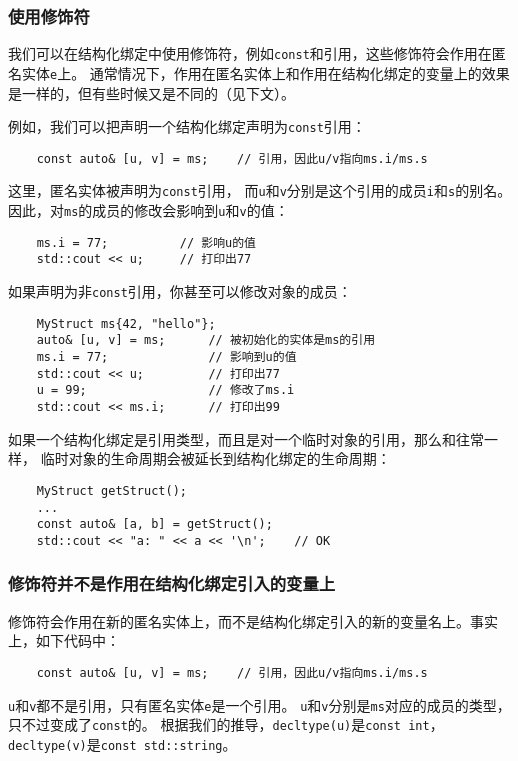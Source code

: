 \subsubsection{使用修饰符}
我们可以在结构化绑定中使用修饰符，例如\texttt{const}和引用，这些修饰符会作用在匿名实体\texttt{e}上。
通常情况下，作用在匿名实体上和作用在结构化绑定的变量上的效果是一样的，但有些时候又是不同的（见下文）。

例如，我们可以把声明一个结构化绑定声明为\texttt{const}引用：
\begin{lstlisting}
    const auto& [u, v] = ms;    // 引用，因此u/v指向ms.i/ms.s
\end{lstlisting}
这里，匿名实体被声明为\texttt{const}引用，
而\texttt{u}和\texttt{v}分别是这个引用的成员\texttt{i}和\texttt{s}的别名。
因此，对\texttt{ms}的成员的修改会影响到\texttt{u}和\texttt{v}的值：
\begin{lstlisting}
    ms.i = 77;          // 影响u的值
    std::cout << u;     // 打印出77
\end{lstlisting}
如果声明为非\texttt{const}引用，你甚至可以修改对象的成员：
\begin{lstlisting}
    MyStruct ms{42, "hello"};
    auto& [u, v] = ms;      // 被初始化的实体是ms的引用
    ms.i = 77;              // 影响到u的值
    std::cout << u;         // 打印出77
    u = 99;                 // 修改了ms.i
    std::cout << ms.i;      // 打印出99
\end{lstlisting}
如果一个结构化绑定是引用类型，而且是对一个临时对象的引用，那么和往常一样，
临时对象的生命周期会被延长到结构化绑定的生命周期：
\begin{lstlisting}
    MyStruct getStruct();
    ...
    const auto& [a, b] = getStruct();
    std::cout << "a: " << a << '\n';    // OK
\end{lstlisting}

\subsubsection{修饰符并不是作用在结构化绑定引入的变量上}
修饰符会作用在新的匿名实体上，而不是结构化绑定引入的新的变量名上。事实上，如下代码中：
\begin{lstlisting}
    const auto& [u, v] = ms;    // 引用，因此u/v指向ms.i/ms.s
\end{lstlisting}
\texttt{u}和\texttt{v}都不是引用，只有匿名实体\texttt{e}是一个引用。
\texttt{u}和\texttt{v}分别是\texttt{ms}对应的成员的类型，
只不过变成了\texttt{const}的。
根据我们的推导，\texttt{decltype(u)}是\texttt{const int}，
\texttt{decltype(v)}是\texttt{const std::string}。

